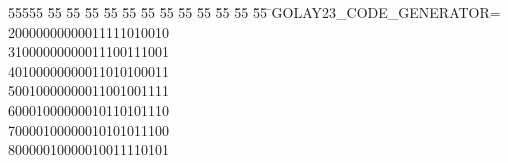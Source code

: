 %
%
\begin{tabbing}
55555 \= 55 \= 55 \= 55 \= 55 \= 55 \= 55 \= 55 \= 55 \= 55 \= 55 \= 55 \= 55 \= \>GOLAY23\_CODE\_GENERATOR=\\[0pt]
20000000000011111010010\\[0pt]
31000000000011100111001\\[0pt]
40100000000011010100011\\[0pt]
50010000000011001001111\\[0pt]
60001000000010110101110\\[0pt]
70000100000010101011100\\[0pt]
80000010000010011110101\\[0pt]

\end{tabbing}
